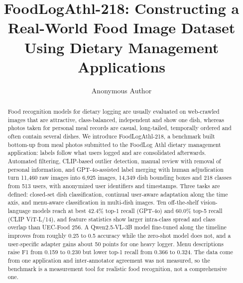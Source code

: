 \documentclass[sigconf, nonacm]{acmart}
\begin{document}
\title{FoodLogAthl-218: Constructing a Real-World Food Image Dataset\\ Using Dietary Management Applications}


\author{Anonymous Author}

\begin{abstract}
Food recognition models for dietary logging are usually evaluated on web-crawled images that are attractive, class-balanced, independent and show one dish, whereas photos taken for personal meal records are casual, long-tailed, temporally ordered and often contain several dishes. We introduce FoodLogAthl-218, a benchmark built bottom-up from meal photos submitted to the FoodLog Athl dietary management application: labels follow what users logged and are consolidated afterwards. Automated filtering, CLIP-based outlier detection, manual review with removal of personal information, and GPT-4o-assisted label merging with human adjudication turn 11,460 raw images into 6,925 images, 14,349 dish bounding boxes and 218 classes from 513 users, with anonymized user identifiers and timestamps. Three tasks are defined: closed-set dish classification, continual user-aware adaptation along the time axis, and menu-aware classification in multi-dish images. Ten off-the-shelf vision-language models reach at best 42.4\% top-1 recall (GPT-4o) and 60.0\% top-5 recall (CLIP ViT-L/14), and feature statistics show larger intra-class spread and class overlap than UEC-Food 256. A Qwen2.5-VL-3B model fine-tuned along the timeline improves from roughly 0.25 to 0.5 accuracy while the zero-shot model does not, and a user-specific adapter gains about 50 points for one heavy logger. Menu descriptions raise F1 from 0.159 to 0.230 but lower top-1 recall from 0.366 to 0.324. The data come from one application and inter-annotator agreement was not measured, so the benchmark is a measurement tool for realistic food recognition, not a comprehensive one.
\end{abstract}

\maketitle
\end{document}
